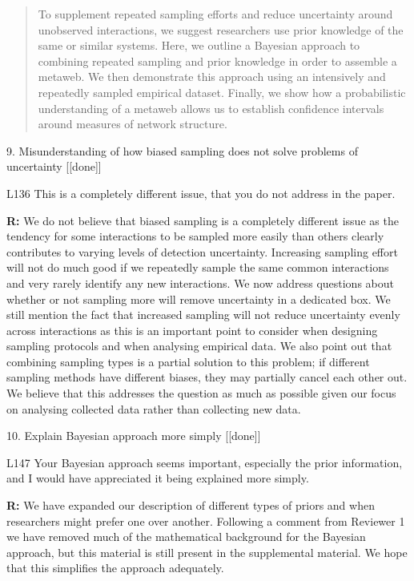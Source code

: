 \documentclass[12pt]{letter}
\newenvironment{refquote}{\bigskip \begin{it}}{\end{it}\smallskip}
\begin{document}
		\begin{quotation}
			To supplement repeated sampling efforts and reduce uncertainty around unobserved interactions, we suggest researchers use prior knowledge of the same or similar systems. Here, we outline a Bayesian approach to combining repeated sampling and prior knowledge in order to assemble a metaweb. We then demonstrate this approach using an intensively and repeatedly sampled empirical dataset. Finally, we show how a probabilistic understanding of a metaweb allows us to establish confidence intervals around measures of network structure.
			\end{quotation}


	9. Misunderstanding of how biased sampling does not solve problems of uncertainty [[done]]

		\begin{refquote}
		L136 This is a completely different issue, that you do not address in the paper.
		\end{refquote}

		\textbf{R:} We do not believe that biased sampling is a completely different issue as the tendency for some interactions to be sampled more easily than others clearly contributes to varying levels of detection uncertainty. Increasing sampling effort will not do much good if we repeatedly sample the same common interactions and very rarely identify any new interactions. We now address questions about whether or not sampling more will remove uncertainty in a dedicated box. We still mention the fact that increased sampling will not reduce uncertainty evenly across interactions as this is an important point to consider when designing sampling protocols and when analysing empirical data. We also point out that combining sampling types is a partial solution to this problem; if different sampling methods have different biases, they may partially cancel each other out. We believe that this addresses the question as much as possible given our focus on analysing collected data rather than collecting new data.


	10. Explain Bayesian approach more simply [[done]]

		\begin{refquote}
		L147 Your Bayesian approach seems important, especially the prior information, and I would have appreciated it being explained more simply.
		\end{refquote}

		\textbf{R:} We have expanded our description of different types of priors and when researchers might prefer one over another. Following a comment from Reviewer 1 we have removed much of the mathematical background for the Bayesian approach, but this material is still present in the supplemental material. We hope that this simplifies the approach adequately.
\end{document}
